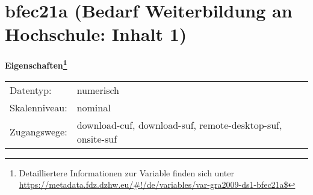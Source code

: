 
    \setcounter{footnote}{0}

    \vspace*{-1.8cm}
	\section{bfec21a (Bedarf Weiterbildung an Hochschule: Inhalt 1)}
	\label{section:bfec21a}



    \vspace*{0.5cm}
    \noindent\textbf{Eigenschaften\footnote{Detailliertere Informationen zur Variable finden sich unter
		\url{https://metadata.fdz.dzhw.eu/\#!/de/variables/var-gra2009-ds1-bfec21a$}}}\\
	\begin{tabularx}{\hsize}{@{}lX}
	Datentyp: & numerisch \\
	Skalenniveau: & nominal \\
	Zugangswege: &
	  download-cuf, 
	  download-suf, 
	  remote-desktop-suf, 
	  onsite-suf
 \\
    \end{tabularx}



